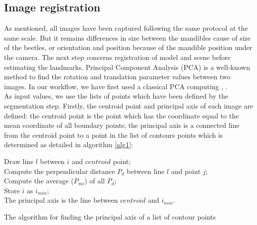 \documentclass[twoside,twocolumn,10pt]{article}
\begin{document}
\subsection{Image registration}
As mentioned, all images have been captured following the same protocol at the same scale. But it remains differences in size between the mandibles cause of size of the beetles, or orientation and position because of the mandible position under the camera. The next step concerns registration of model and scene before estimating the landmarks. Principal Component Analysis (PCA) is a well-known method to find the rotation and translation parameter values between two images. In our workflow, we have first used a classical PCA computing \cite{bsspca}, \cite{shlens2014tutorial}.\\
As input values, we use the lists of points which have been defined by the segmentation step. Firstly, the centroid point and principal axis of each image are defined: the centroid point is the point which has the coordinate equal to the mean coordinate of all boundary points; the principal axis is a connected line from the centroid point to a point in the list of contours points which is determined as detailed in algorithm \ref{alg1}:
\begin{algorithm}
	{
		Draw line $l$ between $i$ and $centroid$ point;\\
		{
			{
				Compute the perpendicular distance $P_d$ between line $l$ and point $j$;\\
			}		
		}
		Compute the average ($P_{mi}$) of all $P_d$;\\
		{
			Store $i$ as $i_{min}$;\\
		}
	}
	The principal axis is the line between $centroid$ and $i_{min}$.
	\caption{The algorithm for finding the principal axis of a list of contour points}
	\label{alg1}
\end{algorithm}\\
\end{document}
